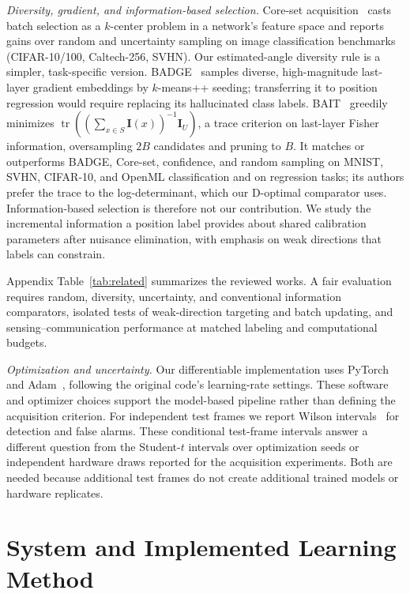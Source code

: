 \documentclass[conference]{IEEEtran}
\begin{document}
\emph{Diversity, gradient, and information-based selection.} Core-set acquisition~\cite{coreset} casts batch selection as a $k$-center problem in a network's feature space and reports gains over random and uncertainty sampling on image classification benchmarks (CIFAR-10/100, Caltech-256, SVHN). Our estimated-angle diversity rule is a simpler, task-specific version. BADGE~\cite{badge} samples diverse, high-magnitude last-layer gradient embeddings by $k$-means++ seeding; transferring it to position regression would require replacing its hallucinated class labels. BAIT~\cite{bait} greedily minimizes $\operatorname{tr}((\sum_{x\in S}\mathbf I(x))^{-1}\mathbf I_U)$, a trace criterion on last-layer Fisher information, oversampling $2B$ candidates and pruning to $B$. It matches or outperforms BADGE, Core-set, confidence, and random sampling on MNIST, SVHN, CIFAR-10, and OpenML classification and on regression tasks; its authors prefer the trace to the log-determinant, which our D-optimal comparator uses. Information-based selection is therefore not our contribution. We study the incremental information a position label provides about shared calibration parameters after nuisance elimination, with emphasis on weak directions that labels can constrain.

Appendix Table~\ref{tab:related} summarizes the reviewed works. A fair evaluation requires random, diversity, uncertainty, and conventional information comparators, isolated tests of weak-direction targeting and batch updating, and sensing--communication performance at matched labeling and computational budgets.



\emph{Optimization and uncertainty.} Our differentiable implementation uses PyTorch~\cite{pytorch} and Adam~\cite{adam}, following the original code's learning-rate settings. These software and optimizer choices support the model-based pipeline rather than defining the acquisition criterion. For independent test frames we report Wilson intervals~\cite{wilson} for detection and false alarms. These conditional test-frame intervals answer a different question from the Student-$t$ intervals over optimization seeds or independent hardware draws reported for the acquisition experiments. Both are needed because additional test frames do not create additional trained models or hardware replicates.
\section{System and Implemented Learning Method}
\end{document}
